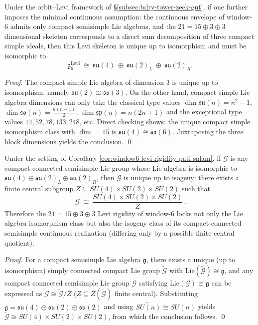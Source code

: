 \begin{corollary}[Levi rigidity locking: the Pati--Salam-type skeleton forced by \texorpdfstring{$21=15\oplus 3\oplus 3$}{21=15+3+3}]\label{cor:window6-levi-rigidity-pati-salam}
Under the orbit--Levi framework of \S\ref{subsec:bdry-tower-zeck-gut}, if one further imposes the minimal continuous assumption: the continuous envelope of window-\(6\) admits only compact semisimple Lie algebras,
and the \(21=15\oplus 3\oplus 3\) dimensional skeleton corresponds to a direct sum decomposition of three compact simple ideals,
then this Levi skeleton is unique up to isomorphism and must be isomorphic to
\[
\mathfrak g^{\mathrm{Levi}}_6\ \cong\ \mathfrak{su}(4)\ \oplus\ \mathfrak{su}(2)_L\ \oplus\ \mathfrak{su}(2)_R.
\]
\end{corollary}
\begin{proof}
The compact simple Lie algebra of dimension \(3\) is unique up to isomorphism, namely \(\mathfrak{su}(2)\cong\mathfrak{so}(3)\).
On the other hand, compact simple Lie algebra dimensions can only take the classical type values
\(\dim\mathfrak{su}(n)=n^2-1\), \(\dim\mathfrak{so}(n)=\frac{n(n-1)}2\), \(\dim\mathfrak{sp}(n)=n(2n+1)\)
and the exceptional type values \(14,52,78,133,248\), etc.
Direct checking shows: the unique compact simple isomorphism class with \(\dim=15\) is \(\mathfrak{su}(4)\cong\mathfrak{so}(6)\).
Juxtaposing the three block dimensions yields the conclusion. \qed
\end{proof}

\begin{corollary}\label{cor:window6-levi-rigidity-pati-salam-isogeny}
Under the setting of Corollary \ref{cor:window6-levi-rigidity-pati-salam}, if \(\mathcal{G}\) is any compact connected semisimple Lie group whose Lie algebra is isomorphic to
\(
\mathfrak{su}(4)\oplus\mathfrak{su}(2)_L\oplus\mathfrak{su}(2)_R
\),
then \(\mathcal{G}\) is unique up to isogeny: there exists a finite central subgroup \(Z\subseteq SU(4)\times SU(2)\times SU(2)\) such that
\[
\boxed{\;
\mathcal{G}\ \cong\ \frac{SU(4)\times SU(2)\times SU(2)}{Z}\; }.
\]
Therefore the \(21=15\oplus 3\oplus 3\) Levi rigidity of window-\(6\) locks not only the Lie algebra isomorphism class but also the isogeny class of its compact connected semisimple continuous realization (differing only by a possible finite central quotient).
\end{corollary}
\begin{proof}
For a compact semisimple Lie algebra \(\mathfrak g\), there exists a unique (up to isomorphism) simply connected compact Lie group \(\widetilde{\mathcal{G}}\) with \(\mathrm{Lie}(\widetilde{\mathcal{G}})\cong\mathfrak g\), and any compact connected semisimple Lie group \(\mathcal{G}\) satisfying \(\mathrm{Lie}(\mathcal{G})\cong\mathfrak g\) can be expressed as \(\mathcal{G}\cong \widetilde{\mathcal{G}}/Z\) (\(Z\subseteq Z(\widetilde{\mathcal{G}})\) finite central).
Substituting \(\mathfrak g=\mathfrak{su}(4)\oplus\mathfrak{su}(2)\oplus\mathfrak{su}(2)\) and using \(\widetilde{SU(n)}\cong SU(n)\) yields \(\widetilde{\mathcal{G}}\cong SU(4)\times SU(2)\times SU(2)\), from which the conclusion follows. \qed
\end{proof}

